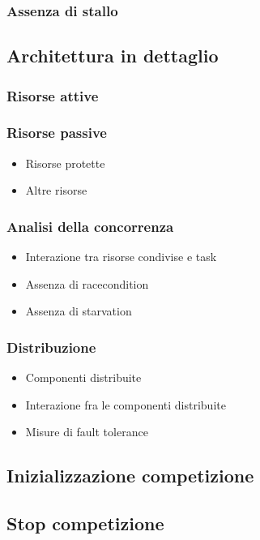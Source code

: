 \subsubsection{Assenza di stallo}
\subsection{Architettura in dettaglio}
\subsubsection{Risorse attive}
\subsubsection{Risorse passive}
\begin{itemize}
\item{Risorse protette}
\item{Altre risorse}
\end{itemize}
\subsubsection{Analisi della concorrenza}
\begin{itemize}
\item{Interazione tra risorse condivise e task}
\item{Assenza di racecondition}
\item{Assenza di starvation}
\end{itemize}
\subsubsection{Distribuzione}
\begin{itemize}
\item{Componenti distribuite}%
\item{Interazione fra le componenti distribuite}
\item{Misure di fault tolerance}
\end{itemize}
\subsection{Inizializzazione competizione}
\subsection{Stop competizione}
